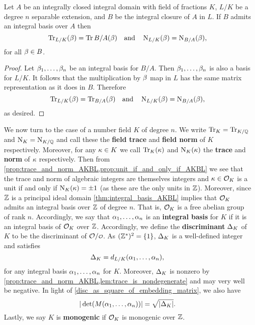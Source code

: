     \begin{proposition}\label{prop:trace_and_norm_reduce_for_integral_basis}
      Let $A$ be an integrally closed integral domain with field of fractions $K$, $L/K$ be a degree $n$ separable extension, and $B$ be the integral closure of $A$ in $L$. If $B$ admits an integral basis over $A$ then
      \[
        \operatorname{\mathrm{Tr}}_{L/K}(\beta) = \operatorname{\mathrm{Tr}}{B/A}(\beta) \quad \text{and} \quad \operatorname{\mathrm{N}}_{L/K}(\beta) = \operatorname{\mathrm{N}}_{B/A}(\beta),
      \]
      for all $\beta \in B$.
    \end{proposition}
    \begin{proof}
      Let $\beta_{1},\ldots,\beta_{n}$ be an integral basis for $B/A$. Then $\beta_{1},\ldots,\beta_{n}$ is also a basis for $L/K$. It follows that the multiplication by $\beta$ map in $L$ has the same matrix representation as it does in $B$. Therefore
      \[
        \operatorname{\mathrm{Tr}}_{L/K}(\beta) = \operatorname{\mathrm{Tr}}_{B/A}(\beta) \quad \text{and} \quad \operatorname{\mathrm{N}}_{L/K}(\beta) = \operatorname{\mathrm{N}}_{B/A}(\beta),
      \]
      as desired.
    \end{proof}

    We now turn to the case of a number field $K$ of degree $n$. We write $\operatorname{\mathrm{Tr}}_{K} = \operatorname{\mathrm{Tr}}_{K/\mathbb{Q}}$ and $\operatorname{\mathrm{N}}_{K} = \operatorname{\mathrm{N}}_{K/\mathbb{Q}}$ and call these the \textbf{field trace} and \textbf{field norm} of $K$ respectively. Moreover, for any $\kappa \in K$ we call $\operatorname{\mathrm{Tr}}_{K}(\kappa)$ and $\operatorname{\mathrm{N}}_{K}(\kappa)$ the \textbf{trace} and \textbf{norm} of $\kappa$ respectively. Then from \cref{prop:trace_and_norm_AKBL,prop:unit_if_and_only_if_AKBL} we see that the trace and norm of algebraic integers are themselves integers and $\kappa \in \mathcal{O}_{K}$ is a unit if and only if $\operatorname{\mathrm{N}}_{K}(\kappa) = \pm 1$ (as these are the only units in $\mathbb{Z}$). Moreover, since $\mathbb{Z}$ is a principal ideal domain \cref{thm:integral_basis_AKBL} implies that $\mathcal{O}_{K}$ admits an integral basis over $\mathbb{Z}$ of degree $n$. That is, $\mathcal{O}_{K}$ is a free abelian group of rank $n$. Accordingly, we say that $\alpha_{1},\ldots,\alpha_{n}$ is an \textbf{integral basis} for $K$ if it is an integral basis of $\mathcal{O}_{K}$ over $\mathbb{Z}$. Accordingly, we define the \textbf{discriminant} $\Delta_{K}$ of $K$ to be the discriminant of $\mc{O}/\smc{O}$. As $(\mathbb{Z}^{\ast})^{2} = \{1\}$, $\Delta_{K}$ is a well-defined integer and satisfies
    \[
      \Delta_{K} = d_{L/K}(\alpha_{1},\ldots,\alpha_{n}),
    \]
    for any integral basis $\alpha_{1},\ldots,\alpha_{n}$ for $K$. Moreover, $\Delta_{K}$ is nonzero by \cref{prop:trace_and_norm_AKBL,lem:trace_is_nondegenerate} and may very well be negative. In light of \cref{disc_as_square_of_embedding_matrix}, we also have
    \[
      |\det(M(\alpha_{1},\ldots,\alpha_{n}))| = \sqrt{|\Delta_{K}|}.
    \]
    Lastly, we say $K$ is \textbf{monogenic} if $\mathcal{O}_{K}$ is monogenic over $\mathbb{Z}$.

